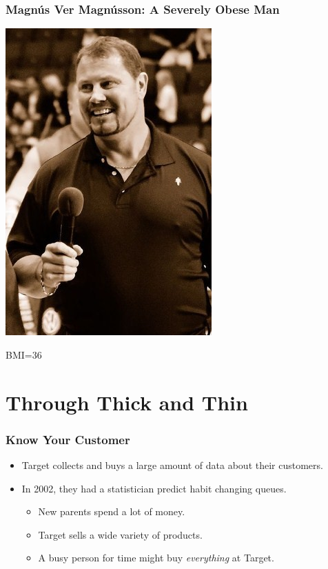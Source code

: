 \documentclass{beamer}
\begin{document}

\begin{frame}
	\frametitle{Magn\'{u}s Ver Magn\'{u}sson: A Severely Obese Man}
	\begin{center}
        \includegraphics[width=0.3\hsize]{art/magnus}
    \end{center}
    BMI=36
\end{frame}


\section{Through Thick and Thin}
\begin{frame}
	\frametitle{Know Your Customer}
	\begin{itemize}
        \item Target collects and buys a large amount of data about their customers.
        \item In 2002, they had a statistician predict habit changing queues.
        \begin{itemize}
            \item<2-> New parents spend a lot of money.
            \item<2-> Target sells a wide variety of products.
            \item<2-> A busy person for time might buy \emph{everything} at Target.
        \end{itemize}
    \end{itemize}
\end{frame}

\end{document}
